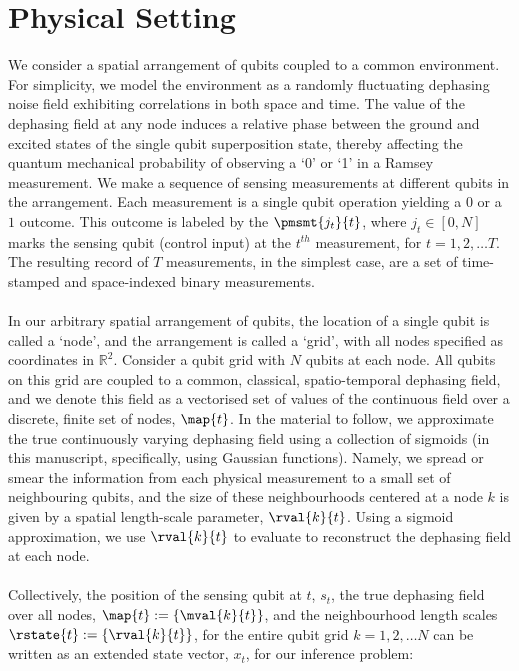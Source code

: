 \section{Physical Setting}\label{sec:physicalsetting}

We consider a spatial arrangement of qubits coupled to a common environment. For simplicity, we model the environment as a randomly fluctuating dephasing noise field exhibiting correlations in both space and time. The value of the dephasing field at any node induces a relative phase between the ground and excited states of the single qubit superposition state, thereby affecting the  quantum mechanical probability of observing a  `0' or `1' in a Ramsey measurement.  We make a sequence of sensing measurements  at different qubits in the arrangement. Each measurement is a single qubit operation yielding a $0$ or a $1$ outcome. This outcome is labeled by the $\pmsmt{j_t}{t}$, where $j_t \in [0, N]$ marks the sensing qubit (control input) at the $t^{th}$ measurement,  for $t = 1,2, \hdots T$. The resulting record of $T$ measurements, in the simplest case, are a set of time-stamped and space-indexed binary measurements. \\
\\ 
In our arbitrary spatial arrangement of qubits, the location of a single qubit is called a `node', and the arrangement is called a `grid', with all nodes specified as coordinates in $\mathbb{R}^2$. Consider a qubit grid with $N$ qubits at each node. All qubits on this grid are coupled to a common, classical, spatio-temporal dephasing field, and we denote this field as a vectorised set of values of the continuous field over a discrete, finite set of nodes, $\map{t}$. In the material to follow, we approximate the true  continuously varying dephasing field using a collection of sigmoids (in this manuscript, specifically, using Gaussian functions). Namely, we spread or smear the information from each physical measurement to a small set of neighbouring qubits, and the size of these neighbourhoods centered at a node $k$ is given by a spatial length-scale parameter, $\rval{k}{t}$. Using a sigmoid approximation, we use $\rval{k}{t}$ to evaluate to reconstruct the dephasing field at each node. \\
\\
Collectively, the position of the sensing qubit at $t$, $s_t$, the true dephasing field over all nodes, $ \map{t}:=\{\mval{k}{t} \}$, and the neighbourhood length scales $\rstate{t}:= \{\rval{k}{t}\}$, for the entire qubit grid $ k= 1, 2, \hdots N $ can be written as an extended state vector, $x_t$, for our inference problem:

